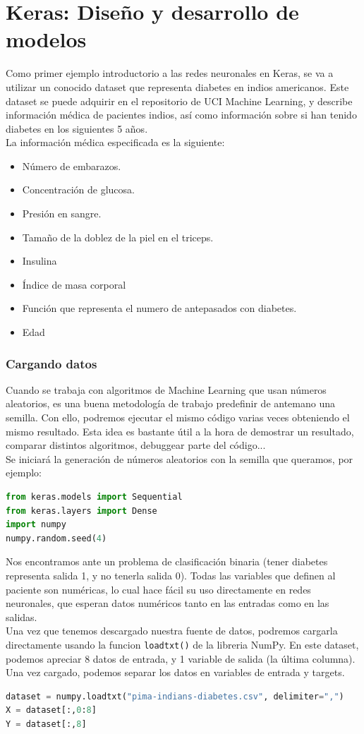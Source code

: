 \chapter{Keras: Diseño y desarrollo de modelos}
Como primer ejemplo introductorio a las redes neuronales en Keras, se va a utilizar un conocido dataset que representa diabetes en indios americanos. Este dataset se puede adquirir en el repositorio de UCI Machine Learning, y describe información médica de pacientes indios, así como información sobre si han tenido diabetes en los siguientes 5 años.\\
La información médica especificada es la siguiente:
\begin{itemize}[noitemsep]
\item Número de embarazos.
\item Concentración de glucosa.
\item Presión en sangre.
\item Tamaño de la doblez de la piel en el triceps.
\item Insulina
\item Índice de masa corporal
\item Función que representa el numero de antepasados con diabetes.
\item Edad
\end{itemize}
\subsection{Cargando datos}
Cuando se trabaja con algoritmos de Machine Learning que usan números aleatorios, es una buena metodología de trabajo predefinir de antemano una semilla. Con ello, podremos ejecutar el mismo código varias veces obteniendo el mismo resultado. Esta idea es bastante útil a la hora de demostrar un resultado, comparar distintos algoritmos, debuggear parte del código...\\
Se iniciará la generación de números aleatorios con la semilla que queramos, por ejemplo:
\begin{lstlisting}[language=Python]
from keras.models import Sequential
from keras.layers import Dense
import numpy
numpy.random.seed(4)
\end{lstlisting}
Nos encontramos ante un problema de clasificación binaria (tener diabetes representa salida 1, y no tenerla salida 0). Todas las variables que definen al paciente son numéricas, lo cual hace fácil su uso directamente en redes neuronales, que esperan datos numéricos tanto en las entradas como en las salidas.\\
Una vez que tenemos descargado nuestra fuente de datos, podremos cargarla directamente usando la funcion \lstinline{loadtxt()} de la libreria NumPy. En este dataset, podemos apreciar 8 datos de entrada, y 1 variable de salida (la última columna). Una vez cargado, podemos separar los datos en variables de entrada y targets.
\begin{lstlisting}[language=Python]
dataset = numpy.loadtxt("pima-indians-diabetes.csv", delimiter=",")
X = dataset[:,0:8]
Y = dataset[:,8]
\end{lstlisting}

